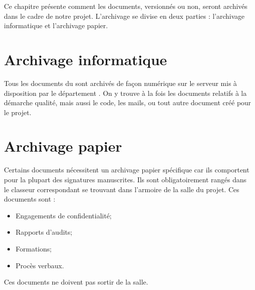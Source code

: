 
Ce chapitre présente comment les documents, versionnés ou non, seront archivés dans le cadre de notre projet. L’archivage se divise en deux parties : l’archivage informatique et l’archivage papier.

\section{Archivage informatique}
Tous les documents du \PICCourt sont archivés de façon numérique sur le serveur \git{} mis à disposition par le département \ASI{}. On y trouve à la fois les documents relatifs à la démarche qualité, mais aussi le code, les mails, ou tout autre document créé pour le projet.

\section{Archivage papier}
Certains documents nécessitent un archivage papier spécifique car ils comportent pour la plupart des signatures manuscrites. Ils sont obligatoirement rangés dans le classeur correspondant se trouvant dans l’armoire de la salle du projet. Ces documents sont :
\begin{itemize}
\item Engagements de confidentialité;
\item Rapports d’audits;
\item Formations;
\item Procès verbaux.
\end{itemize}
Ces documents ne doivent pas sortir de la salle.